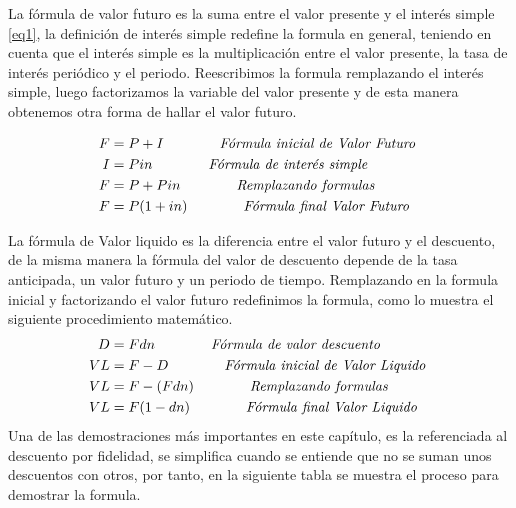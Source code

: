 \begin{spacing}{1.5}
La fórmula de valor futuro es la suma entre el valor presente y el interés simple \ref{eq1}, la definición de interés simple  redefine la formula en general, teniendo en cuenta que el interés simple es la multiplicación entre el valor presente, la tasa de interés periódico y el periodo. Reescribimos la formula remplazando el interés simple, luego factorizamos la variable del valor presente y de esta manera obtenemos otra forma de hallar el valor futuro.
\begin{center}
\begin{align*}
    F &= P+I\hspace{40 pt} \textit{Fórmula inicial de Valor Futuro }\\
    I &= Pin\hspace{40 pt} \textit{Fórmula de interés simple}\\
    F &= P+Pin\hspace{40 pt} \textit{Remplazando formulas}\\
    F &= P(1+in)\hspace{40 pt} \textit{Fórmula final Valor Futuro}
\end{align*}
\end{center}
La fórmula de Valor liquido es la diferencia entre el valor futuro y el descuento, de la misma manera la fórmula del valor de descuento depende de la tasa anticipada, un valor futuro y un periodo de tiempo. Remplazando en la formula inicial y factorizando el valor futuro redefinimos la formula, como lo muestra el siguiente procedimiento matemático.
\clearpage
\begin{align*}
    D &= Fdn\hspace{40 pt} \textit{Fórmula de valor descuento }\\
    VL &= F-D\hspace{40 pt} \textit{Fórmula inicial de Valor Liquido }\\ 
    VL &= F-(Fdn)\hspace{40 pt} \textit{Remplazando formulas}\\
    VL &= F(1-dn)\hspace{40 pt}\textit{Fórmula final Valor Liquido}
\end{align*}
Una de las demostraciones más importantes en este capítulo, es la referenciada al descuento por fidelidad, se simplifica cuando se entiende que no se suman unos descuentos con otros, por tanto, en la siguiente tabla se muestra el proceso para demostrar la formula. 
\begin{center}

\end{center}
\end{spacing}
